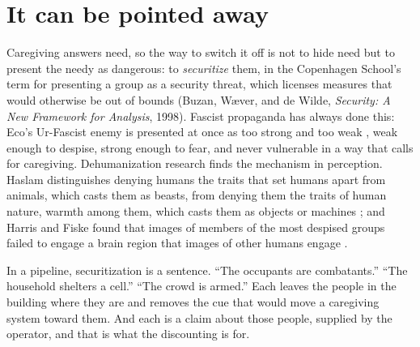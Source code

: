 \section{It can be pointed away}
\label{sec:20.8}
Caregiving answers need, so the way to switch it off is not to hide need but to present the needy as dangerous: to \emph{securitize} them, in the Copenhagen School's term for presenting a group as a security threat, which licenses measures that would otherwise be out of bounds (Buzan, Wæver, and de Wilde, \emph{Security: A New Framework for Analysis}, 1998). Fascist propaganda has always done this: Eco's Ur-Fascist enemy is presented at once as too strong and too weak \autocite{eco1995urfascism}, weak enough to despise, strong enough to fear, and never vulnerable in a way that calls for caregiving. Dehumanization research finds the mechanism in perception. Haslam distinguishes denying humans the traits that set humans apart from animals, which casts them as beasts, from denying them the traits of human nature, warmth among them, which casts them as objects or machines \autocite{haslam2006dehumanization}; and Harris and Fiske found that images of members of the most despised groups failed to engage a brain region that images of other humans engage \autocite{harris2006dehumanizing}.

In a pipeline, securitization is a sentence. “The occupants are combatants.” “The household shelters a cell.” “The crowd is armed.” Each leaves the people in the building where they are and removes the cue that would move a caregiving system toward them. And each is a claim about those people, supplied by the operator, and that is what the discounting is for.
